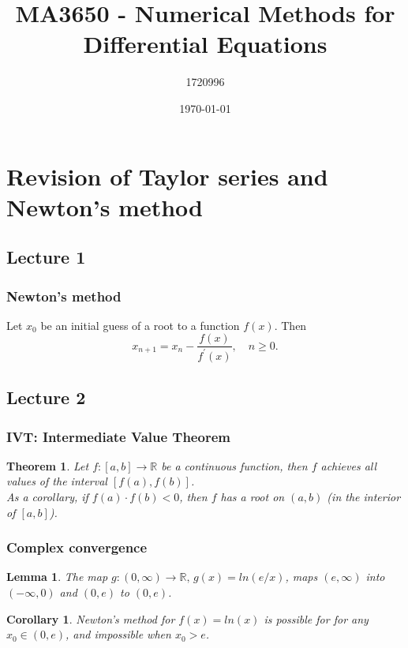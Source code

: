 \documentclass{article}
\title{MA3650 - Numerical Methods for Differential Equations}
\author{1720996}
\date{\today}
\newtheorem{theorem}{Theorem}
\newtheorem{lemma}{Lemma}
\newtheorem{corollary}{Corollary}
\begin{document}
\maketitle

\tableofcontents

\section{Revision of Taylor series and Newton's method}
\subsection{Lecture 1}
\subsubsection{Newton's method}
Let $x_0$ be an initial guess of a root to a function $f(x)$. Then
\begin{equation}
    x_{n+1} = x_n - \frac{f(x)}{f^\prime(x)},\quad n\geq0. \label{eq:newton}
\end{equation}

\subsection{Lecture 2}
\subsubsection{IVT: Intermediate Value Theorem}
\begin{theorem}
Let $f:[a,b]\to \mathbb{R}$ be a continuous function, then $f$ achieves all values of the interval $[f(a),f(b)]$.\\
As a corollary, if $f(a)\cdot f(b)<0$, then $f$ has a root on $(a,b)$ (in the interior of $[a,b]$).
\end{theorem}
\subsubsection{Complex convergence}
\begin{lemma}
    The map $g:(0,\infty)\to\mathbb{R},\,g(x) = ln(e/x)$, maps $(e,\infty)$ into $(-\infty, 0)$ and $(0, e)$
to $(0, e)$.
\end{lemma}
\begin{corollary}
    Newton's method for $f(x) = ln(x)$ is possible for for any $x_0\in(0,e)$, and impossible when $x_0>e$.
\end{corollary}
\end{document}
